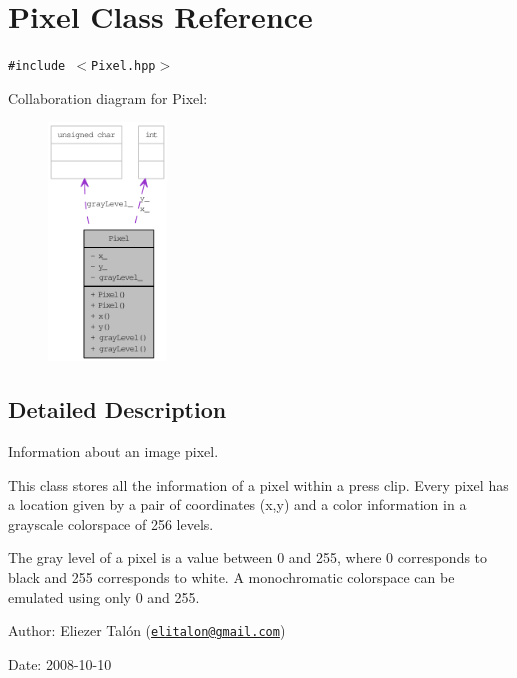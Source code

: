 \hypertarget{class_pixel}{
\section{Pixel Class Reference}
\label{class_pixel}
}
{\tt \#include $<$Pixel.hpp$>$}

Collaboration diagram for Pixel:\nopagebreak
\begin{figure}[H]
\begin{center}
\leavevmode
\includegraphics[width=89pt]{class_pixel__coll__graph}
\end{center}
\end{figure}


\subsection{Detailed Description}
Information about an image pixel. 

This class stores all the information of a pixel within a press clip. Every pixel has a location given by a pair of coordinates (x,y) and a color information in a grayscale colorspace of 256 levels.

The gray level of a pixel is a value between 0 and 255, where 0 corresponds to black and 255 corresponds to white. A monochromatic colorspace can be emulated using only 0 and 255.

\begin{Desc}
\item[Author:]Eliezer Talón (\href{mailto:elitalon@gmail.com}{\tt elitalon@gmail.com}) \end{Desc}
\begin{Desc}
\item[Date:]2008-10-10 \end{Desc}


